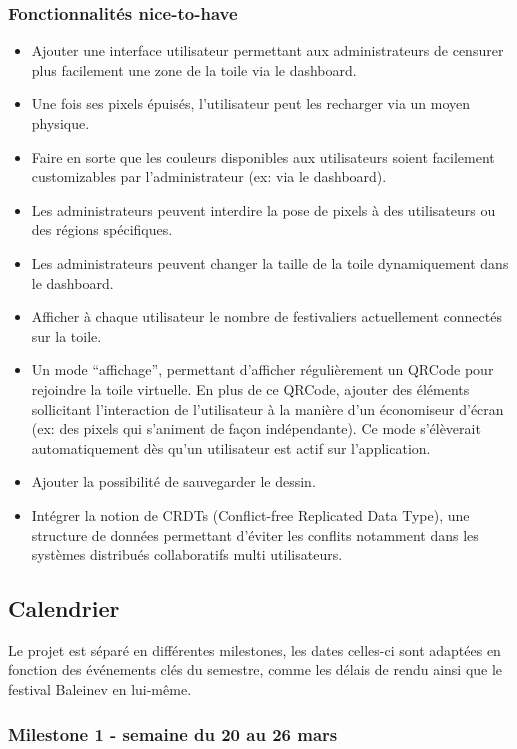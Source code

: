 \subsubsection{Fonctionnalités \guillemotleft nice-to-have\guillemotright}

\begin{itemize}
  \item Ajouter une interface utilisateur permettant aux administrateurs de censurer plus facilement une zone de la toile via le dashboard.
  \item Une fois ses pixels épuisés, l'utilisateur peut les recharger via un moyen physique.
  \item Faire en sorte que les couleurs disponibles aux utilisateurs soient facilement customizables par l'administrateur (ex: via le dashboard).
  \item Les administrateurs peuvent interdire la pose de pixels à des utilisateurs ou des régions spécifiques.
  \item Les administrateurs peuvent changer la taille de la toile dynamiquement dans le dashboard.
  \item Afficher à chaque utilisateur le nombre de festivaliers actuellement connectés sur la toile.
  \item Un mode “affichage”, permettant d'afficher régulièrement un QRCode pour rejoindre la toile virtuelle. En plus de ce QRCode, ajouter des éléments sollicitant l'interaction de l'utilisateur à la manière d'un économiseur d'écran (ex: des pixels qui s'animent de façon indépendante). Ce mode s'élèverait automatiquement dès qu'un utilisateur est actif sur l'application.
  \item Ajouter la possibilité de sauvegarder le dessin.
  \item Intégrer la notion de CRDTs (Conflict-free Replicated Data Type), une structure de données permettant d'éviter les conflits notamment dans les systèmes distribués collaboratifs multi utilisateurs.
\end{itemize}

\subsection{Calendrier}

Le projet est séparé en différentes milestones, les dates celles-ci sont adaptées en fonction des événements clés du semestre, comme les délais de rendu ainsi que le festival Baleinev en lui-même.

\subsubsection{Milestone 1 - semaine du 20 au 26 mars}

